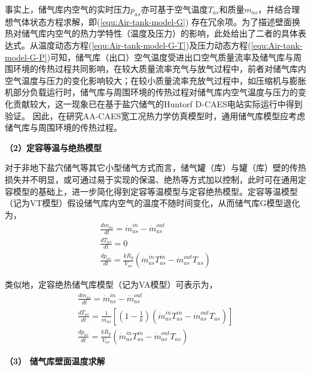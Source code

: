 事实上，储气库内空气的实时压力$p_{as}$亦可基于空气温度$T_{as}$和质量$m_{as}$，并结合理想气体状态方程求解，即(\ref{equ:Air-tank-model-G}) 存在冗余项。为了描述壁面换热对储气库内空气的热力学特性（温度及压力）的影响，此处给出了二者的具体表达式。从温度动态方程(\ref{equ:Air-tank-model-G-T})及压力动态方程(\ref{equ:Air-tank-model-G-P})可知，储气库（出口）空气温度受进出口空气质量流率及储气库与周围环境的传热过程共同影响，在较大质量流率充气与放气过程中，前者对储气库内空气温度与压力的变化影响较大；在较小质量流率充放气过程中，如压缩机与膨胀机部分负载运行时，储气库与周围环境的传热过程对储气库内空气温度与压力的变化贡献较大，这一现象已在基于盐穴储气的Huntorf D-CAES电站实际运行中得到验证\cite{Huntorf-20-01}。 因此，在研究AA-CAES宽工况热力学仿真模型时，通用储气库模型应考虑储气库与周围环境的传热过程。

\textbf{（2）定容等温与绝热模型}

对于非地下盐穴储气等其它小型储气方式而言，储气罐（库）与罐（库）壁的传热损失并不明显，或可通过易于实现的保温、绝热等方式加以控制，此时可在通用定容模型的基础上，进一步简化得到定容等温模型与定容绝热模型。定容等温模型（记为VT模型）假设储气库内空气的温度不随时间变化，从而储气库G模型退化为，
\begin{subequations}
\label{equ:Air-tank-model-VT}
\begin{gather}
    \frac{{d{m_{as}}}}{{dt}} = \dot m_{as}^{in} - \dot m_{as}^{out}\\
    \frac{{d{T_{as}}}}{{dt}} = 0\\
    \frac{{d{p_{as}}}}{{dt}} = \frac{{k{R_g}}}{{{V_{as}}}}( {\dot m_{as}^{in}T_{as}^{in} - \dot m_{as}^{out}T_{as}^{}})
\end{gather}
\end{subequations}

类似地，定容绝热储气库模型（记为VA模型）可表示为，
\begin{subequations}
\label{equ:Air-tank-model-VA}
\begin{gather}
    \frac{{d{m_{as}}}}{{dt}} = \dot m_{as}^{in} - \dot m_{as}^{out}\\
    \frac{{d{T_{as}}}}{{dt}} = \frac{1}{{{m_{as}}}}[ {({1 - \frac{1}{k}})({\dot m_{as}^{in}T_{as}^{in} - \dot m_{as}^{out}T_{as}^{}} )} ]\\
    \frac{{d{p_{as}}}}{{dt}} = \frac{{k{R_g}}}{{{V_{as}}}}({\dot m_{as}^{in}T_{as}^{in} - \dot m_{as}^{out}T_{as}^{}})
\end{gather}
\end{subequations}


\textbf{（3） 储气库壁面温度求解}


